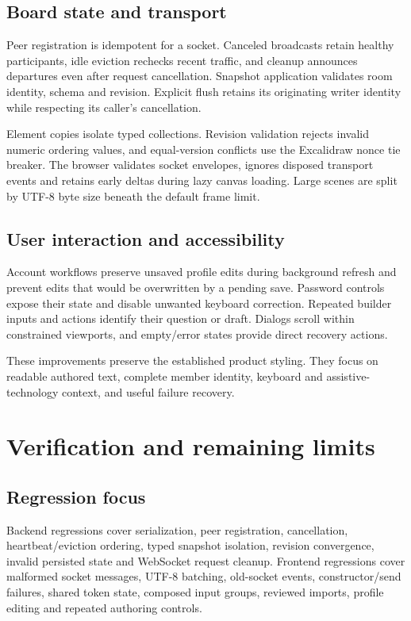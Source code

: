 \documentclass[10pt,a4paper]{article}
\begin{document}
\subsection{Board state and transport}
Peer registration is idempotent for a socket. Canceled broadcasts retain healthy participants, idle eviction rechecks recent traffic, and cleanup announces departures even after request cancellation. Snapshot application validates room identity, schema and revision. Explicit flush retains its originating writer identity while respecting its caller's cancellation.

Element copies isolate typed collections. Revision validation rejects invalid numeric ordering values, and equal-version conflicts use the Excalidraw nonce tie breaker. The browser validates socket envelopes, ignores disposed transport events and retains early deltas during lazy canvas loading. Large scenes are split by UTF-8 byte size beneath the default frame limit.

\subsection{User interaction and accessibility}
Account workflows preserve unsaved profile edits during background refresh and prevent edits that would be overwritten by a pending save. Password controls expose their state and disable unwanted keyboard correction. Repeated builder inputs and actions identify their question or draft. Dialogs scroll within constrained viewports, and empty/error states provide direct recovery actions.

These improvements preserve the established product styling. They focus on readable authored text, complete member identity, keyboard and assistive-technology context, and useful failure recovery.

\clearpage
\section{Verification and remaining limits}


\subsection{Regression focus}
Backend regressions cover serialization, peer registration, cancellation, heartbeat/eviction ordering, typed snapshot isolation, revision convergence, invalid persisted state and WebSocket request cleanup. Frontend regressions cover malformed socket messages, UTF-8 batching, old-socket events, constructor/send failures, shared token state, composed input groups, reviewed imports, profile editing and repeated authoring controls.
\end{document}
